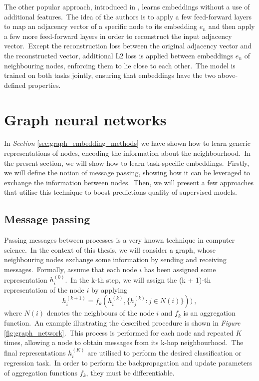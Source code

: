\documentclass[longabstract, english, mgr]{iithesis}
\theoremstyle{default_theorem_style}\newtheorem{theorem}{Theorem}
\theoremstyle{default_theorem_style}\newtheorem{definition}{Definition}
\begin{document}
\noindent The other popular approach, introduced in \cite{sdne}, learns embeddings without a use of additional
features.\ The idea of the authors is to apply a few feed-forward layers to map an adjacency vector of a specific node
to its embedding $e_n$ and then apply a few more feed-forward layers in order to reconstruct the input adjacency
vector.\ Except the reconstruction loss between the original adjacency vector and the reconstructed vector, additional
L2 loss is applied between embeddings $e_n$ of neighbouring nodes, enforcing them to lie close to each other.\ The model
is trained on both tasks jointly, ensuring that embeddings have the two above-defined properties.

\section{Graph neural networks}\label{sec:graph_neural_networks}

In \textit{Section} \ref{sec:graph_embedding_methods} we have shown how to learn generic representations of nodes,
encoding the information about the neighbourhood.\ In the present section, we will show how to learn task-specific
embeddings.\ Firstly, we will define the notion of message passing, showing how it can be leveraged to exchange the
information between nodes.\ Then, we will present a few approaches that utilise this technique to boost
predictions quality of supervised models.

\subsection{Message passing}

Passing messages between processes is a very known technique in computer science.\ In the context of this thesis, we
will consider a graph, whose neighbouring nodes exchange some information by sending and receiving
messages.\ Formally, assume that each node $i$ has been assigned some representation $h_i^{(0)}$.\ In the k-th
step, we will assign the (k + 1)-th representation of the node $i$ by applying
\begin{equation}\label{eq:message_passing}
h_i^{(k + 1)} = f_k(h_i^{(k)}, \{h_j^{(k)} : j \in N(i)\}))\ ,
\end{equation}
where $N(i)$ denotes the neighbours of the node $i$ and $f_k$ is an aggregation function.\ An example illustrating
the described procedure is shown in \textit{Figure} \ref{fig:graph_network}.\ This process is performed
for each node and repeated $K$ times, allowing a node to obtain messages from its k-hop neighbourhood.\ The
final representations $h_i^{(K)}$ are utilised to perform the desired classification or regression task.\ In order to
perform the backpropagation and update parameters of aggregation functions $f_k$, they must be
differentiable.\newline
\end{document}
